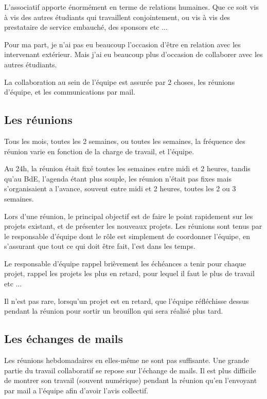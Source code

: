     L'associatif apporte énormément en terme de relations humaines. Que ce soit vis à vis des autres étudiants qui travaillent conjointement, ou vis à vis des prestataire de service embauché, des sponsors etc ...
    
    Pour ma part, je n'ai pas eu beaucoup l'occasion d'être en relation avec les intervenant extérieur.
    Mais j'ai eu beaucoup plus d'occasion de collaborer avec les autres étudiants.
    
    La collaboration au sein de l'équipe est assurée par 2 choses, les réunions d'équipe, et les communications par mail.

    \subsection{Les réunions}

        Tous les mois, toutes les 2 semaines, ou toutes les semaines, la fréquence des réunion varie en fonction de la charge de travail, et l'équipe.

        Au 24h, la réunion était fixé toutes les semaines entre midi et 2 heures, tandis qu'au BdE, l'agenda étant plus souple, les réunion n'était pas fixes mais s'organisaient a l'avance, souvent entre midi et 2 heures, toutes les 2 ou 3 semaines.

        Lors d'une réunion, le principal objectif est de faire le point rapidement sur les projets existant, et de présenter les nouveaux projets. Les réunions sont tenus par le responsable d'équipe dont le rôle est simplement de coordonner l'équipe, en s'assurant que tout ce qui doit être fait, l'est dans les temps.
        
        Le responsable d'équipe rappel brièvement les échéances a tenir pour chaque projet, rappel les projets les plus en retard, pour lequel il faut le plus de travail etc ...
        
        Il n'est pas rare, lorsqu'un projet est en retard, que l'équipe réfléchisse dessus pendant la réunion pour sortir un brouillon qui sera réalisé plus tard.
    
    \subsection{Les échanges de mails}

        Les réunions hebdomadaires en elles-même ne sont pas suffisante. Une grande partie du travail collaboratif se repose sur l'échange de mails.
        Il est plus difficile de montrer son travail (souvent numérique) pendant la réunion qu'en l'envoyant par mail a l'équipe afin d'avoir l'avis collectif.


